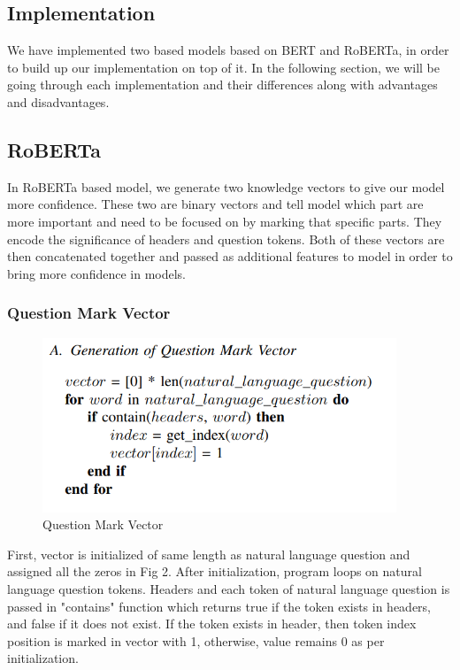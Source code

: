 \documentclass[12pt]{article}
\begin{document}
\subsection{Implementation}
We have implemented two based models based on BERT and RoBERTa, in order to build up our implementation on top of it. In the following section, we will be going through each implementation and their differences along with advantages and disadvantages. 

\subsection{RoBERTa}
In RoBERTa based model, we generate two knowledge vectors to give our model more confidence. These two are binary vectors and tell model which part are more important and need to be focused on by marking that specific parts. They encode the significance of headers and question tokens. Both of these vectors are then concatenated together and passed as additional features to model in order to bring more confidence in models. 


\subsubsection{Question Mark Vector}
\begin{figure}[H]
    \includegraphics[width=300pt]{QMV}
    \caption{Question Mark Vector}
    \label{fig:Question mark vector}
\end{figure}

First, vector is initialized of same length as natural language question and assigned all the zeros in Fig 2. After initialization, program loops on natural language question tokens. Headers and each token of natural language question is passed in "contains" function which returns true if the token exists in headers, and false if it does not exist. If the token exists in header, then token index position is marked in vector with 1, otherwise, value remains 0 as per initialization. 
\end{document}
